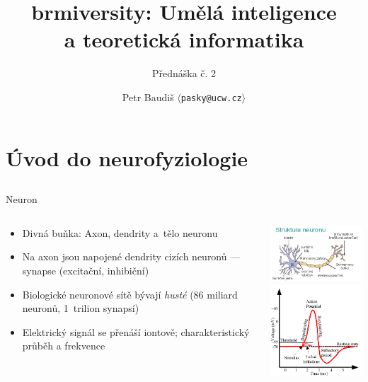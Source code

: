 \documentclass{beamer}
\begin{document}

\title{brmiversity: Umělá inteligence\\a teoretická informatika}
\subtitle{Přednáška č. 2}
\author{Petr Baudiš $\langle${\tt pasky@ucw.cz}$\rangle$}
\date{}
\frame{\titlepage}

\section{Úvod do neurofyziologie}

\subsection{}
\begin{frame}{Neuron}
\begin{columns}
\begin{column}{6cm}
\begin{itemize}
\item Divná buňka: Axon, dendrity a~tělo neuronu
\item Na axon jsou napojené dendrity cizích neuronů --- synapse (excitační, inhibiční)
\item Biologické neuronové sítě bývají {\em husté} (86 miliard neuronů, 1~trilion synapsí)
\item Elektrický signál se přenáší iontově; charakteristický průběh a frekvence
\end{itemize}
\end{column}
\begin{column}{5cm}
\includegraphics[width=5cm]{Neuron-cs.jpg} \\
\includegraphics[width=5cm]{ActionPotential.png}
\end{column}
\end{columns}
\end{frame}
\end{document}
